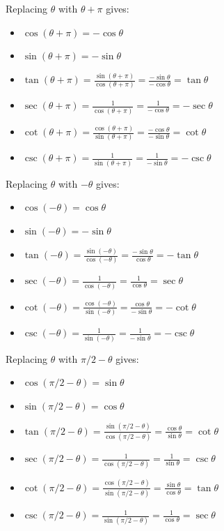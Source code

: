 \documentclass{article}
\newcommand{\dr}[1]{\textcolor{dark_red}{#1}}
\newcommand{\dg}[1]{\textcolor{dark_green}{#1}}
\newcommand{\db}[1]{\textcolor{dark_blue}{#1}}
\begin{document}
Replacing \(\theta\) with \(\theta + \pi\) gives:
\begin{itemize}
\item \dr{\(\cos(\theta + \pi) = -\cos\theta\)}
\item \dr{\(\sin(\theta + \pi) = -\sin\theta\)}
\item \dg{\(\tan(\theta + \pi) = \frac{\sin(\theta + \pi)}{\cos(\theta + \pi)} = \frac{-\sin\theta}{-\cos\theta} = \tan\theta\)}
\item \dg{\(\sec(\theta + \pi) = \frac{1}{\cos(\theta + \pi)} = \frac{1}{-\cos\theta} = -\sec\theta\)}
\item \db{\(\cot(\theta + \pi) = \frac{\cos(\theta + \pi)}{\sin(\theta + \pi)} = \frac{-\cos\theta}{-\sin\theta} = \cot\theta\)}
\item \db{\(\csc(\theta + \pi) = \frac{1}{\sin(\theta + \pi)} = \frac{1}{-\sin\theta} = -\csc\theta\)}
\end{itemize}

Replacing \(\theta\) with \(-\theta\) gives:
\begin{itemize}
\item \dr{\(\cos(-\theta) = \cos\theta\)}
\item \dr{\(\sin(-\theta) = -\sin\theta\)}
\item \dg{\(\tan(-\theta) = \frac{\sin(-\theta)}{\cos(-\theta)} = \frac{-\sin\theta}{\cos\theta} = -\tan\theta\)}
\item \dg{\(\sec(-\theta) = \frac{1}{\cos(-\theta)} = \frac{1}{\cos\theta} = \sec\theta\)}
\item \db{\(\cot(-\theta) = \frac{\cos(-\theta)}{\sin(-\theta)} = \frac{\cos\theta}{-\sin\theta} = -\cot\theta\)}
\item \db{\(\csc(-\theta) = \frac{1}{\sin(-\theta)} = \frac{1}{-\sin\theta} = -\csc\theta\)}
\end{itemize}

Replacing \(\theta\) with \(\pi/2-\theta\) gives:
\begin{itemize}
\item \dr{\(\cos(\pi/2-\theta) = \sin\theta\)}
\item \dr{\(\sin(\pi/2-\theta) = \cos\theta\)}
\item \dg{\(\tan(\pi/2-\theta) = \frac{\sin(\pi/2-\theta)}{\cos(\pi/2-\theta)} = \frac{\cos\theta}{\sin\theta} = \cot\theta\)}
\item \dg{\(\sec(\pi/2-\theta) = \frac{1}{\cos(\pi/2-\theta)} = \frac{1}{\sin\theta} = \csc\theta\)}
\item \db{\(\cot(\pi/2-\theta) = \frac{\cos(\pi/2-\theta)}{\sin(\pi/2-\theta)} = \frac{\sin\theta}{\cos\theta} = \tan\theta\)}
\item \db{\(\csc(\pi/2-\theta) = \frac{1}{\sin(\pi/2-\theta)} = \frac{1}{\cos\theta} = \sec\theta\)}
\end{itemize}
\end{document}
